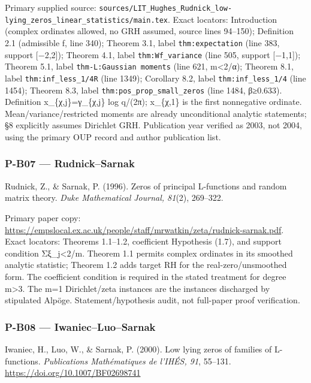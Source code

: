 \documentclass[11pt,a4paper]{article}
\theoremstyle{definition}\newtheorem{definition}{Definition}
\begin{document}
Primary supplied source:
\nolinkurl{sources/LIT_Hughes_Rudnick_low-lying_zeros_linear_statistics/main.tex}.
Exact locators: Introduction (complex ordinates allowed, no GRH assumed,
source lines 94--150); Definition 2.1 (admissible f, line 340); Theorem
3.1, label \nolinkurl{thm:expectation} (line 383, support {[}−2,2{]});
Theorem 4.1, label \nolinkurl{thm:Wf_variance} (line 505, support
{[}−1,1{]}); Theorem 5.1, label \texttt{thm-L:Gaussian\ moments} (line
621, m\textless2/α); Theorem 8.1, label \nolinkurl{thm:inf_less_1/4R}
(line 1349); Corollary 8.2, label \nolinkurl{thm:inf_less_1/4} (line
1454); Theorem 8.3, label \nolinkurl{thm:pos_prop_small_zeros} (line
1484, β≥0.633). Definition x\_\{χ,j\}=γ\_\{χ,j\} log q/(2π); x\_\{χ,1\}
is the first nonnegative ordinate. Mean/variance/restricted moments are
already unconditional analytic statements; §8 explicitly assumes
Dirichlet GRH. Publication year verified as 2003, not 2004, using the
primary OUP record and author publication list.

\subsubsection{P-B07 --- Rudnick--Sarnak}\label{p-b07--rudnicksarnak}

Rudnick, Z., \& Sarnak, P. (1996). Zeros of principal L-functions and
random matrix theory. \emph{Duke Mathematical Journal, 81}(2), 269--322.

Primary paper copy:
\url{https://empslocal.ex.ac.uk/people/staff/mrwatkin/zeta/rudnick-sarnak.pdf}.
Exact locators: Theorems 1.1--1.2, coefficient Hypothesis (1.7), and
support condition Σ\textbar ξ\_j\textbar\textless2/m. Theorem 1.1
permits complex ordinates in its smoothed analytic statistic; Theorem
1.2 adds target RH for the real-zero/unsmoothed form. The coefficient
condition is required in the stated treatment for degree m\textgreater3.
The m=1 Dirichlet/zeta instances are the instances discharged by
stipulated Alpöge. Statement/hypothesis audit, not full-paper proof
verification.

\subsubsection{P-B08 ---
Iwaniec--Luo--Sarnak}\label{p-b08--iwaniecluosarnak}

Iwaniec, H., Luo, W., \& Sarnak, P. (2000). Low lying zeros of families
of L-functions. \emph{Publications Mathématiques de l'IHÉS, 91},
55--131. \url{https://doi.org/10.1007/BF02698741}
\end{document}
